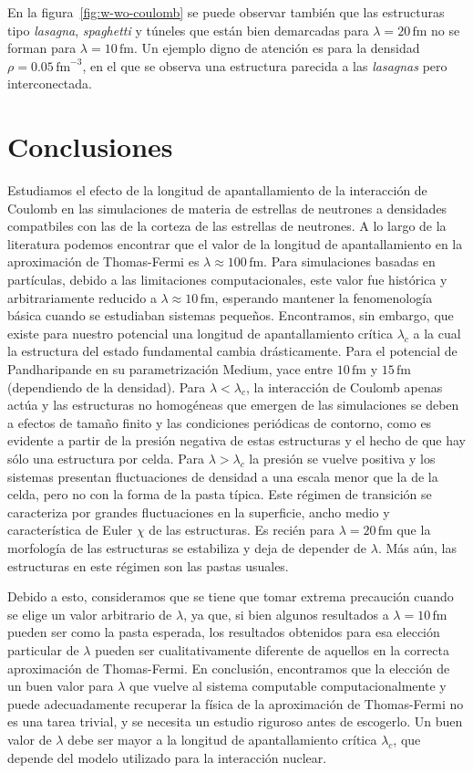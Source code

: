 En la figura~\ref{fig:w-wo-coulomb} se puede observar también que las estructuras tipo \emph{lasagna}, \emph{spaghetti} y túneles que están bien demarcadas para $\lambda = 20\,\text{fm}$ no se forman para $\lambda = 10\,\text{fm}$.
Un ejemplo digno de atención es para la densidad $\rho = 0.05\,\text{fm}^{-3}$, en el que se observa una estructura parecida a las \emph{lasagnas} pero interconectada.

\section{Conclusiones}\label{concluding}

Estudiamos el efecto de la longitud de apantallamiento de la interacción de Coulomb en las simulaciones de materia de estrellas de neutrones a densidades compatbiles con las de la corteza de las estrellas de neutrones.
A lo largo de la literatura podemos encontrar que el valor de la longitud de apantallamiento en la aproximación de Thomas-Fermi es $\lambda\approx100\,\text{fm}$.
Para simulaciones basadas en partículas, debido a las limitaciones computacionales, este valor fue histórica y arbitrariamente reducido a $\lambda\approx10\,\text{fm}$, esperando mantener la fenomenología básica cuando se estudiaban sistemas pequeños.
Encontramos, sin embargo, que existe para nuestro potencial una longitud de apantallamiento crítica $\lambda_c$ a la cual la estructura del estado fundamental cambia drásticamente.
Para el potencial de Pandharipande en su parametrización Medium, yace entre $10\,\text{fm}$ y $15\,\text{fm}$ (dependiendo de la densidad).
Para $\lambda<\lambda_c$, la interacción de Coulomb apenas actúa y las estructuras no homogéneas que emergen de las simulaciones se deben a efectos de tamaño finito y las condiciones periódicas de contorno, como es evidente a partir de la presión negativa de estas estructuras y el hecho de que hay sólo una estructura por celda.
Para $\lambda>\lambda_c$ la presión se vuelve positiva y los sistemas presentan fluctuaciones de densidad a una escala menor que la de la celda, pero no con la forma de la pasta típica.
Este régimen de transición se caracteriza por grandes fluctuaciones en la superficie, ancho medio y característica de Euler $\chi$ de las estructuras.
Es recién para $\lambda=20\,\text{fm}$ que la morfología de las estructuras se estabiliza y deja de depender de $\lambda$.
Más aún, las estructuras en este régimen son las pastas usuales.

Debido a esto, consideramos que se tiene que tomar extrema precaución cuando se elige un valor arbitrario de $\lambda$, ya que, si bien algunos resultados a $\lambda=10\,\text{fm}$ pueden ser como la pasta esperada, los resultados obtenidos para esa elección particular de $\lambda$ pueden ser cualitativamente diferente de aquellos en la correcta aproximación de Thomas-Fermi.
En conclusión, encontramos que la elección de un buen valor para $\lambda$ que vuelve al sistema computable computacionalmente y puede adecuadamente recuperar la física de la aproximación de Thomas-Fermi no es una tarea trivial, y se necesita un estudio riguroso antes de escogerlo.
Un buen valor de $\lambda$ debe ser mayor a la longitud de apantallamiento crítica $\lambda_c$, que depende del modelo utilizado para la interacción nuclear.

